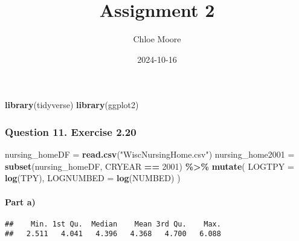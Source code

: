 \documentclass[
]{article}
\title{Assignment 2}
\author{Chloe Moore}
\date{2024-10-16}
\newenvironment{Shaded}{\begin{snugshade}}{\end{snugshade}}
\newcommand{\AttributeTok}[1]{\textcolor[rgb]{0.13,0.29,0.53}{#1}}
\newcommand{\CommentTok}[1]{\textcolor[rgb]{0.56,0.35,0.01}{\textit{#1}}}
\newcommand{\DecValTok}[1]{\textcolor[rgb]{0.00,0.00,0.81}{#1}}
\newcommand{\FunctionTok}[1]{\textcolor[rgb]{0.13,0.29,0.53}{\textbf{#1}}}
\newcommand{\NormalTok}[1]{#1}
\newcommand{\OtherTok}[1]{\textcolor[rgb]{0.56,0.35,0.01}{#1}}
\newcommand{\SpecialCharTok}[1]{\textcolor[rgb]{0.81,0.36,0.00}{\textbf{#1}}}
\newcommand{\StringTok}[1]{\textcolor[rgb]{0.31,0.60,0.02}{#1}}
\begin{document}
\maketitle

\begin{Shaded}
\begin{Highlighting}[]
\FunctionTok{library}\NormalTok{(tidyverse)}
\FunctionTok{library}\NormalTok{(ggplot2)}
\end{Highlighting}
\end{Shaded}

\hypertarget{question-11.-exercise-2.20}{%
\subsubsection{Question 11. Exercise
2.20}\label{question-11.-exercise-2.20}}

\begin{Shaded}
\begin{Highlighting}[]
\NormalTok{nursing\_homeDF }\OtherTok{=} \FunctionTok{read.csv}\NormalTok{(}\StringTok{"WiscNursingHome.csv"}\NormalTok{)}
\NormalTok{nursing\_home2001 }\OtherTok{=} \FunctionTok{subset}\NormalTok{(nursing\_homeDF, CRYEAR }\SpecialCharTok{==} \DecValTok{2001}\NormalTok{) }\SpecialCharTok{\%\textgreater{}\%}
  \FunctionTok{mutate}\NormalTok{(}
    \AttributeTok{LOGTPY =} \FunctionTok{log}\NormalTok{(TPY),}
    \AttributeTok{LOGNUMBED =} \FunctionTok{log}\NormalTok{(NUMBED)}
\NormalTok{  )}
\end{Highlighting}
\end{Shaded}

\hypertarget{part-a}{%
\paragraph{Part a)}\label{part-a}}

\begin{Shaded}
\end{Shaded}

\begin{verbatim}
##    Min. 1st Qu.  Median    Mean 3rd Qu.    Max. 
##   2.511   4.041   4.396   4.368   4.700   6.088
\end{verbatim}

\begin{Shaded}
\end{Shaded}
\end{document}
